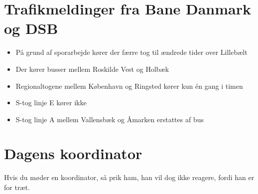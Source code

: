 

\begin{minipage}[b]{0.95\linewidth}
\begin{minipage}[t]{0.47\textwidth}
\vspace{1mm}
\section*{Trafikmeldinger fra Bane Danmark og DSB}
\begin{itemize}
\item På grund af sporarbejde kører der færre tog til ændrede tider over Lillebælt
\item Der kører busser mellem Roskilde Vest og Holbæk
\item Regionaltogene mellem København og Ringsted kører kun én gang i timen
\item S-tog linje E kører ikke
\item S-tog linje A mellem Vallensbæk og Åmarken erstattes af bus
\end{itemize}

\section*{Dagens koordinator}
Hvis du møder en koordinator, så prik ham, han vil dog ikke reagere, fordi han er for træt.


\end{minipage}
\end{minipage}
